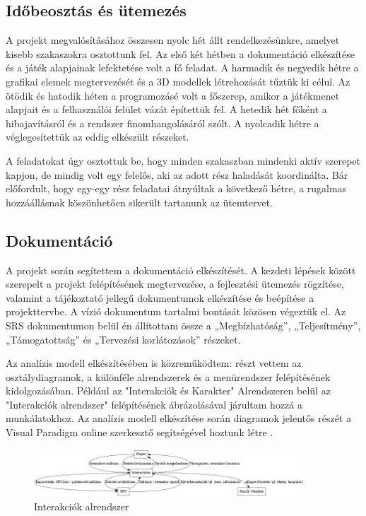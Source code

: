 \documentclass[12pt,a4paper]{article}
\begin{document}
\subsection{Időbeosztás és ütemezés}

A projekt megvalósításához összesen nyolc hét állt rendelkezésünkre, amelyet kisebb szakaszokra osztottunk fel. Az első két hétben a dokumentáció elkészítése és a játék alapjainak lefektetése volt a fő feladat. A harmadik és negyedik hétre a grafikai elemek megtervezését és a 3D modellek létrehozását tűztük ki célul. Az ötödik és hatodik héten a programozásé volt a főszerep, amikor a játékmenet alapjait és a felhasználói felület vázát építettük fel. A hetedik hét főként a hibajavításról és a rendszer finomhangolásáról szólt. A nyolcadik hétre a véglegesítettük az eddig elkészült részeket.

A feladatokat úgy osztottuk be, hogy minden szakaszban mindenki aktív szerepet kapjon, de mindig volt egy felelős, aki az adott rész haladását koordinálta. Bár előfordult, hogy egy-egy rész feladatai átnyúltak a következő hétre, a rugalmas hozzáállásnak köszönhetően sikerült tartanunk az ütemtervet.

\subsection{Dokumentáció}
A projekt során segítettem a dokumentáció elkészítését. A kezdeti lépések között szerepelt a projekt felépítésének megtervezése, a fejlesztési ütemezés rögzítése, valamint a tájékoztató jellegű dokumentumok elkészítése és beépítése a projekttervbe. A vízió dokumentum tartalmi bontását közösen végeztük el. Az SRS dokumentumon belül én állítottam össze a „Megbízhatóság”, „Teljesítmény”, „Támogatottság” és „Tervezési korlátozások” részeket.

Az analízis modell elkészítésében is közreműködtem: részt vettem az osztálydiagramok, a különféle alrendszerek és a menürendszer felépítésének kidolgozásában. Például az "Interakciók és Karakter" Alrendszeren belül az "Interakciók alrendszer" felépítésének ábrázolásával járultam hozzá a munkálatokhoz. Az analízis modell elkészítése során diagramok jelentős részét a Visual Paradigm online szerkesztő segítségével hoztunk létre \cite{visual_paradigm}.

\begin{figure}[h]
    \centering
    \includegraphics[width=0.9\textwidth]{latex/images/interactions_dynamic.png}
    \caption{Interakciók alrendszer}
    \label{fig:classdia}
\end{figure}
\end{document}
